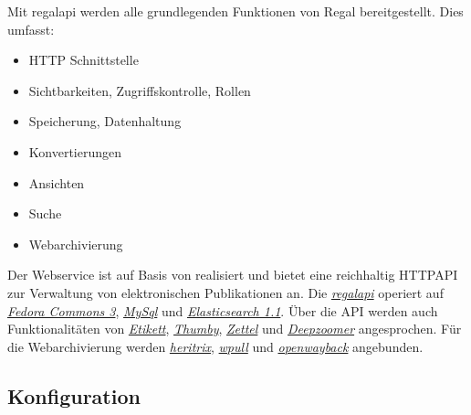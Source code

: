 \documentclass[letterpaper,10pt,english]{sphinxmanual}
\begin{document}
\sphinxAtStartPar
Mit regal\sphinxhyphen{}api werden alle grundlegenden Funktionen von Regal
bereitgestellt. Dies umfasst:
\begin{itemize}
\item {} 
\sphinxAtStartPar
HTTP Schnittstelle

\item {} 
\sphinxAtStartPar
Sichtbarkeiten, Zugriffskontrolle, Rollen

\item {} 
\sphinxAtStartPar
Speicherung, Datenhaltung

\item {} 
\sphinxAtStartPar
Konvertierungen

\item {} 
\sphinxAtStartPar
Ansichten

\item {} 
\sphinxAtStartPar
Suche

\item {} 
\sphinxAtStartPar
Webarchivierung

\end{itemize}

\sphinxAtStartPar
Der Webservice ist auf Basis von 
realisiert und bietet eine reichhaltig HTTP\sphinxhyphen{}API zur Verwaltung von
elektronischen Publikationen an. Die {\hyperref[\detokenize{toscience:_regal_api_2}]{\emph{regal\sphinxhyphen{}api}}}
operiert auf {\hyperref[\detokenize{toscience:_fedora_commons_3}]{\emph{Fedora Commons 3}}},
{\hyperref[\detokenize{toscience:_mysql}]{\emph{MySql}}} und {\hyperref[\detokenize{toscience:_elasticsearch_1_1}]{\emph{Elasticsearch 1.1}}}.
Über die API werden auch Funktionalitäten von {\hyperref[\detokenize{toscience:_etikett}]{\emph{Etikett}}},
{\hyperref[\detokenize{toscience:_thumby}]{\emph{Thumby}}}, {\hyperref[\detokenize{toscience:_zettel}]{\emph{Zettel}}} und
{\hyperref[\detokenize{toscience:_deepzoomer}]{\emph{Deepzoomer}}} angesprochen. Für die Webarchivierung
werden {\hyperref[\detokenize{toscience:_heritrix}]{\emph{heritrix}}}, {\hyperref[\detokenize{toscience:_wpull}]{\emph{wpull}}} und
{\hyperref[\detokenize{toscience:_openwayback}]{\emph{openwayback}}} angebunden.


\subsection{Konfiguration}
\label{\detokenize{toscience:konfiguration}}\label{\detokenize{toscience:id20}}
\end{document}

